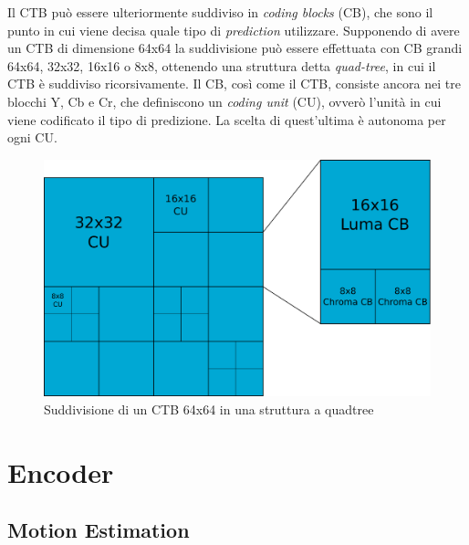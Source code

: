 Il CTB può essere ulteriormente suddiviso in \emph{coding blocks} (CB), che 
sono il punto in cui viene decisa quale tipo di \emph{prediction} utilizzare.
Supponendo di avere un CTB di dimensione 64x64 la suddivisione può essere 
effettuata con CB grandi 64x64, 32x32, 16x16 o 8x8, ottenendo una struttura
detta \emph{quad-tree}, in cui il CTB è suddiviso ricorsivamente. 
Il CB, così come il CTB, consiste ancora nei tre blocchi Y, Cb e 
Cr, che definiscono un \emph{coding unit} (CU), ovverò l'unità in cui viene 
codificato il tipo di predizione. La scelta di quest'ultima è autonoma per ogni 
CU.
\begin{figure}[H]
  \centering
  \includegraphics[scale=0.50]{Figures/CTB-CU-CB}
  \caption[Suddivisione del CTB in CU]{Suddivisione di un CTB 64x64 in una 
struttura a quadtree}
\end{figure}



\section{Encoder}


\subsection{Motion Estimation}


